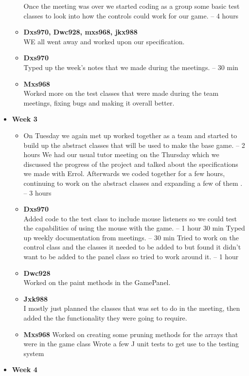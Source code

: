 \begin{itemize}
\begin{itemize}
    Once the meeting was over we started coding as a group some basic
    test classes to look into how the controls could work for our
    game.  – 4 hours
  \item \textbf{Dxs970, Dwc928, mxs968, jkx988}\\
    WE all went away and worked upon our specification.
  \item \textbf{Dxs970}\\ Typed up the week’s notes that we made
    during the meetings. – 30 min
  \item \textbf{Mxs968}\\
    Worked more on the test classes that were made during the team
    meetings, fixing bugs and making it overall better.
  \end{itemize}
\item \textbf{Week 3}
  \begin{itemize}
  \item On Tuesday we again met up worked together as a team and
    started to build up the abstract classes that will be used to make
    the base game. – 2 hours We had our usual tutor meeting on the
    Thursday which we discussed the progress of the project and talked
    about the specifications we made with Errol.  Afterwards we coded
    together for a few hours, continuing to work on the abstract
    classes and expanding a few of them . – 3 hours
  \item \textbf{Dxs970}\\
    Added code to the test class to include mouse listeners so we
    could test the capabilities of using the mouse with the game. – 1
    hour 30 min Typed up weekly documentation from meetings. – 30 min
    Tried to work on the control class and the classes it needed to be
    added to but found it didn’t want to be added to the panel class
    so tried to work around it. – 1 hour
  \item \textbf{Dwc928}\\
    Worked on the paint methods in the GamePanel.
  \item \textbf{Jxk988}\\
    I mostly just planned the classes that was set to do in the
    meeting, then added the the functionality they were going to
    require.
  \item \textbf{Mxs968} Worked on creating some pruning methods for
    the arrays that were in the game class Wrote a few J unit tests to
    get use to the testing system
  \end{itemize}
\item \textbf{Week 4}

\end{itemize}
